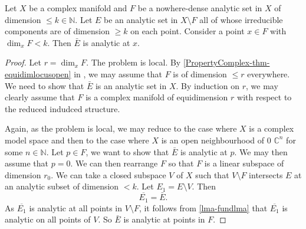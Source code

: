 \begin{thm}\label{thm-RS1}
    Let $X$ be a complex manifold and $F$ be a nowhere-dense analytic set in $X$ of dimension $\leq k\in \mathbb{N}$. Let $E$ be an analytic set in $X\setminus F$ all of whose irreducible components are of dimension $\geq k$ on each point. Consider a point $x\in F$ with $\dim_x F<k$. Then $\bar{E}$ is analytic at $x$.
\end{thm}
\begin{proof}
    Let $r=\dim_x F$.
    The problem is local. By \cref{PropertyComplex-thm-equidimlocusopen} in ,  we may assume that $F$ is of dimension $\leq r$ everywhere. We need to show that $\bar{E}$ is an analytic set in $X$.
     By induction on $r$, we may clearly assume that $F$ is a complex manifold of equidimension $r$ with respect to the reduced indudced structure.

    Again, as the problem is local, we may reduce to the case where $X$ is a complex model space and then to the case where $X$ is an open neighbourhood of $0$ $\mathbb{C}^n$ for some $n\in \mathbb{N}$. Let $p\in F$, we want to show that $\bar{E}$ is analytic at $p$. We may then assume that $p=0$. We can then rearrange $F$ so that $F$ is a linear subspace of dimension $r_0$. We can take a closed subspace $V$ of $X$ such that $V\setminus F$ intersects $E$ at an analytic subset of dimension $<k$. Let $E_1=E\setminus V$. Then 
    \[
        \overline{E_1}=\bar{E}.  
    \]
    As $\overline{E_1}$ is analytic at all points in $V\setminus F$, it follows from \cref{lma-fundlma} that $\overline{E_1}$ is analytic on all points of $V$. So $\bar{E}$ is analytic at points in $F$.

\end{proof}

